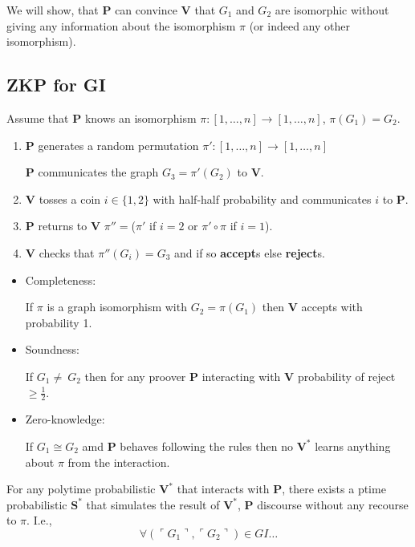 \documentclass[a4paper,12pt]{article}
\theoremstyle{definition}
\theoremstyle{remark}
\begin{document}
We will show, that \textbf{P} can convince \textbf{V} that $G_1$ and $G_2$ are isomorphic without giving any information about the isomorphism
$\pi$ (or indeed any other isomorphism).

\subsection{ZKP for GI}
Assume that \textbf{P} knows an isomorphism $\pi: [1, \dots, n] \to [1, \dots, n]$, $\pi (G_1) = G_2$.

\begin{enumerate}
    \item \textbf{P} generates a random permutation $\pi': [1, \dots, n] \to [1, \dots, n]$
    
    \textbf{P} communicates the graph $G_3 = \pi'(G_2)$ to \textbf{V}.

    \item \textbf{V} tosses a coin $i \in \{1, 2\}$ with half-half probability and communicates $i$ to \textbf{P}.
    
    \item \textbf{P} returns to \textbf{V} $\pi'' = $($\pi'$ if $i = 2$ or $\pi' \circ \pi$ if $i = 1$).

    \item \textbf{V} checks that $\pi''(G_i) = G_3$ and if so \textbf{accept}s else \textbf{reject}s.
\end{enumerate}

\begin{itemize}
    \item Completeness:
    
    If $\pi$ is a graph isomorphism with $G_2 = \pi(G_1)$ then \textbf{V} accepts with probability 1.
    
    \item Soundness:
    
    If $G_1 \neq~ G_2$ then for any proover \textbf{P} interacting with \textbf{V} probability of reject $\geq \frac{1}{2}$.
    
    \item Zero-knowledge:
    
    If $G_1 \cong G_2$ amd \textbf{P} behaves following the rules then no $\textbf{V}^*$ learns anything about $\pi$ from the interaction.
\end{itemize}

For any polytime probabilistic $\textbf{V}^*$ that interacts with \textbf{P}, there exists a ptime probabilistic $\textbf{S}^*$ that simulates the result
of $\textbf{V}^*$, \textbf{P} discourse without any recourse to $\pi$. I.e.,
\begin{equation*}
    \forall (\ulcorner G_1 \urcorner, \ulcorner G_2 \urcorner) \in GI \dots
\end{equation*}
\end{document}
